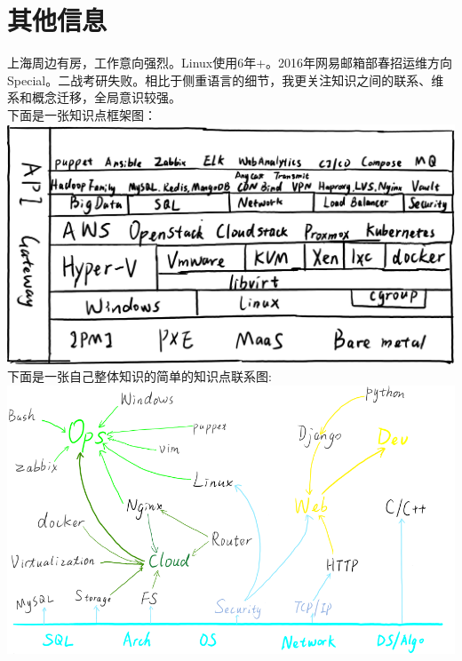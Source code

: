 \documentclass[]{friggeri-cv}
\begin{document}
\section{其他信息}
上海周边有房，工作意向强烈。Linux使用6年+。2016年网易邮箱部春招运维方向Special。二战考研失败。相比于侧重语言的细节，我更关注知识之间的联系、维系和概念迁移，全局意识较强。\\
下面是一张知识点框架图：\\
\includegraphics[scale=0.336]{img/arch.png}
\\
下面是一张自己整体知识的简单的知识点联系图:\\
\includegraphics[scale=0.60]{img/devopsgraph.png}
\end{document}
